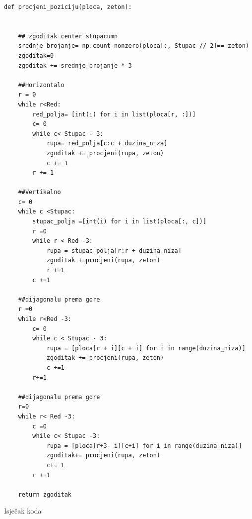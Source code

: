 \documentclass[]{foi}
\begin{document}
\begin{listing}
    \begin{verbatim}
def procjeni_poziciju(ploca, zeton):
    

    ## zgoditak center stupacumn
    srednje_brojanje= np.count_nonzero(ploca[:, Stupac // 2]== zeton)
    zgoditak=0
    zgoditak += srednje_brojanje * 3

    ##Horizontalo
    r = 0
    while r<Red:
        red_polja= [int(i) for i in list(ploca[r, :])]
        c= 0
        while c< Stupac - 3:
            rupa= red_polja[c:c + duzina_niza]
            zgoditak += procjeni(rupa, zeton)
            c += 1
        r += 1

    ##Vertikalno
    c= 0
    while c <Stupac:
        stupac_polja =[int(i) for i in list(ploca[:, c])]
        r =0
        while r < Red -3:
            rupa = stupac_polja[r:r + duzina_niza]
            zgoditak +=procjeni(rupa, zeton)
            r +=1
        c +=1

    ##dijagonalu prema gore
    r =0
    while r<Red -3:
        c= 0
        while c < Stupac - 3:
            rupa = [ploca[r + i][c + i] for i in range(duzina_niza)]
            zgoditak += procjeni(rupa, zeton)
            c +=1
        r+=1

    ##dijagonalu prema gore
    r=0
    while r< Red -3:
        c =0
        while c< Stupac -3:
            rupa = [ploca[r+3- i][c+i] for i in range(duzina_niza)]
            zgoditak+= procjeni(rupa, zeton)
            c+= 1
        r +=1

    return zgoditak
    \end{verbatim}
    \caption{Isječak koda}
    \label{lst:dva}
\end{listing}
\end{document}
